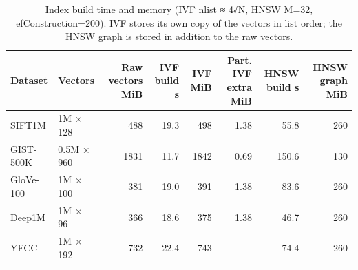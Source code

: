 \begin{table}[t]
\centering\small
\caption{Index build time and memory (IVF nlist ≈ 4√N, HNSW M=32, efConstruction=200). IVF stores its own copy of the vectors in list order; the HNSW graph is stored in addition to the raw vectors.}
\label{tab:indexes}
\begin{tabular}{llrrrrrr}
\toprule
Dataset & Vectors & Raw vectors MiB & IVF build s & IVF MiB & Part. IVF extra MiB & HNSW build s & HNSW graph MiB \\
\midrule
SIFT1M & 1M × 128 & 488 & 19.3 & 498 & 1.38 & 55.8 & 260 \\
GIST-500K & 0.5M × 960 & 1831 & 11.7 & 1842 & 0.69 & 150.6 & 130 \\
GloVe-100 & 1M × 100 & 381 & 19.0 & 391 & 1.38 & 83.6 & 260 \\
Deep1M & 1M × 96 & 366 & 18.6 & 375 & 1.38 & 46.7 & 260 \\
YFCC & 1M × 192 & 732 & 22.4 & 743 & – & 74.4 & 260 \\
\bottomrule
\end{tabular}
\end{table}
